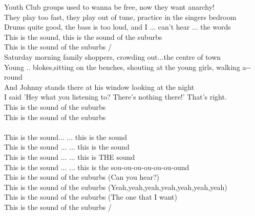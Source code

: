  Youth Club groups used to  wanna be free,  now they want  anarchy!\\
They  play too fast, they  play out of tune,  practice in the  singers bedroom\\
 Drums quite good, the bass is too loud, and  I ... can't hear ... the  words\\
This is the  sound, this is the  sound of the  suburbs\\
 This is the  sound of the  suburbs  /  \\
 Saturday morning family shoppers, crowding out...the centre of  town\\
 Young .. blokes,sitting on the benches, shouting at the young girls, walking a--round\\
 And Johnny  stands there at his  window looking at the night\\
I said 'Hey what you  listening to? There's  nothing there!'  That's right.\\
 This is the  sound of the  suburbs\\
 This is the  sound of the  suburbs\\
       \\
This is the  sound... ... this is the  sound\\
This is the  sound ...  ... this is the  sound\\
This is the  sound ...  ... this is THE  sound\\
This is the  sound ...  ... this is the  sou-ou-ou-ou-ou-ou-ound\\
 This is the  sound of the  suburbs  (Can you hear?)\\
 This is the  sound of the  suburbs  (Yeah,yeah,yeah,yeah,yeah,yeah,yeah)\\
 This is the  sound of the  suburbs  (The one that I want)\\
 This is the  sound of the  suburbs  /  
